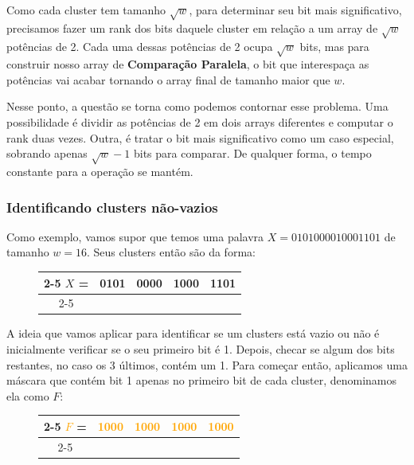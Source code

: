 Como cada cluster tem tamanho $\sqrt w$, para determinar seu bit mais
significativo, precisamos fazer um rank dos bits daquele cluster em relação a um
array de $\sqrt w$ potências de 2. Cada uma dessas potências de 2 ocupa
$\sqrt{w}$ bits, mas para construir nosso array de \textbf{Comparação Paralela},
o bit que interespaça as potências vai acabar tornando o array final de tamanho
maior que $w$. 

Nesse ponto, a questão se torna como podemos contornar esse problema. Uma
possibilidade é dividir as potências de 2 em dois arrays diferentes e computar o
rank duas vezes. Outra, é tratar o bit mais significativo como um caso especial,
sobrando apenas $\sqrt{w}-1$ bits para comparar. De qualquer forma, o tempo
constante para a operação se mantém.

\subsubsection{Identificando clusters não-vazios}

Como exemplo, vamos supor que temos uma palavra $X=0101000010001101$ de tamanho
$w=16$. Seus clusters então são da forma:

\begin{figure}[h]
 \bf \Large\centering
 \begin{tabular}{c|cccc|}
\cline{2-5}
\textcolor{PineGreen}{$X$} = &
\textcolor{PineGreen}{0101} &
\textcolor{PineGreen}{0000} &
\textcolor{PineGreen}{1000} &
\textcolor{PineGreen}{1101} \\
\cline{2-5}
  \end{tabular}
\end{figure}

A ideia que vamos aplicar para identificar se um clusters está vazio ou não é
inicialmente verificar se o seu primeiro bit é 1. Depois, checar se algum dos
bits restantes, no caso os 3 últimos, contém um 1. Para começar então, aplicamos
uma máscara que contém bit 1 apenas no primeiro bit de cada cluster, denominamos
ela como $F$:

\begin{figure}[h]
 \bf \Large\centering
 \begin{tabular}{c|cccc|}
\cline{2-5}
\textcolor{orange}{$F$} = &
\textcolor{orange}{1000} &
\textcolor{orange}{1000} &
\textcolor{orange}{1000} &
\textcolor{orange}{1000} \\
\cline{2-5}
  \end{tabular}
\end{figure}

